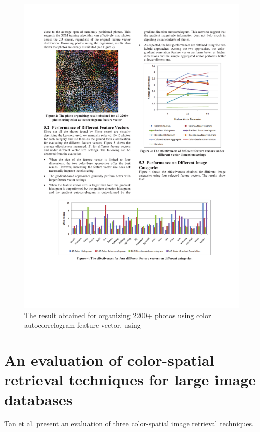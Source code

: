 \begin{figure}[ht]
	\centering
		\includegraphics[scale=1]{imgs-RelatedWork/Strong1}
	\caption{The result obtained for organizing 2200+ photos using color autocorrelogram feature vector, using \cite{Strong:2009p413}}
	\label{fig:Strong1}
\end{figure}



\section{An evaluation of color-spatial retrieval techniques for large image databases} %
\label{sub:Tan}

Tan et al. \cite{Tan:2001p850} present an evaluation of three color-spatial image retrieval techniques.

